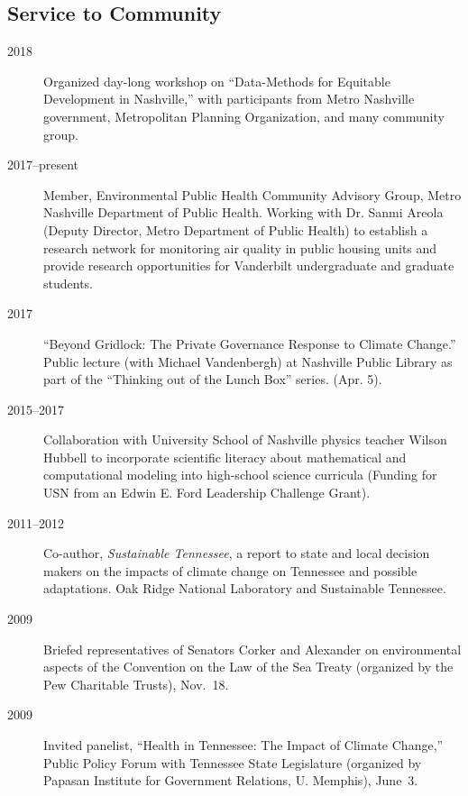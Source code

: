 \documentclass[10pt]{article}
\begin{document}
	\subsection{Service to Community}
    	\begin{description}
    		\item[2018] Organized day-long workshop on ``Data-Methods for Equitable Development in Nashville,'' with participants from Metro Nashville government, Metropolitan Planning Organization,
    		and many community group.
            \item[2017--present] Member, Environmental Public Health Community Advisory Group, Metro Nashville Department of Public Health. Working with Dr. Sanmi Areola (Deputy Director, Metro Department of Public Health)
            to establish a research network for monitoring air quality in public housing units and provide research opportunities for Vanderbilt undergraduate and graduate students.
            \item[2017] ``Beyond Gridlock: The Private Governance Response to Climate Change.'' Public lecture (with Michael Vandenbergh) at Nashville Public Library as part of the ``Thinking out of the Lunch Box'' series. (Apr. 5).
        	\item[2015--2017] Collaboration with University School of Nashville physics teacher Wilson Hubbell to incorporate scientific literacy about mathematical and computational modeling into high-school science curricula (Funding for USN from an Edwin E. Ford Leadership Challenge Grant).
    		\item[2011--2012] Co-author, \emph{Sustainable Tennessee}, a report to state and local decision makers on the impacts of climate change on Tennessee and possible adaptations. Oak Ridge National Laboratory and Sustainable Tennessee.
        	\item[2009] Briefed representatives of Senators Corker and Alexander on environmental aspects of the Convention on the Law of the Sea Treaty (organized by the Pew Charitable Trusts), Nov.~18.
        	\item[2009] Invited panelist, ``Health in Tennessee: The Impact of Climate Change,'' Public Policy Forum with Tennessee State Legislature (organized by Papasan Institute for Government Relations, U. Memphis), June~3.

\end{description}
\end{document}
